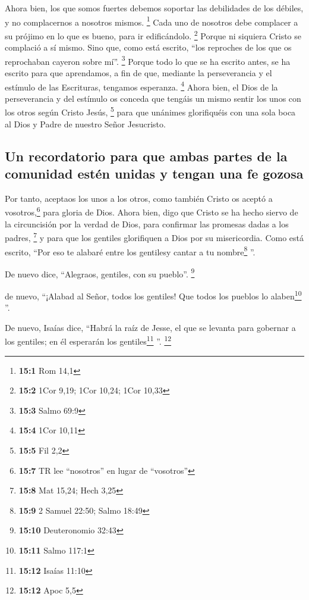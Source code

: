 \begin{paracol}{2}
 Ahora bien, los que somos fuertes debemos soportar las
debilidades de los débiles, y no complacernos a nosotros mismos.
\footnote{\textbf{15:1} Rom 14,1}  Cada uno de nosotros
debe complacer a su prójimo en lo que es bueno, para ir edificándolo.
\footnote{\textbf{15:2} 1Cor 9,19; 1Cor 10,24; 1Cor 10,33}
 Porque ni siquiera Cristo se complació a sí mismo. Sino
que, como está escrito, ``los reproches de los que os reprochaban
cayeron sobre mí''. \footnote{\textbf{15:3} Salmo 69:9} 
Porque todo lo que se ha escrito antes, se ha escrito para que
aprendamos, a fin de que, mediante la perseverancia y el estímulo de las
Escrituras, tengamos esperanza. \footnote{\textbf{15:4} 1Cor 10,11}
 Ahora bien, el Dios de la perseverancia y del estímulo os
conceda que tengáis un mismo sentir los unos con los otros según Cristo
Jesús, \footnote{\textbf{15:5} Fil 2,2}  para que unánimes
glorifiquéis con una sola boca al Dios y Padre de nuestro Señor
Jesucristo.

\hypertarget{un-recordatorio-para-que-ambas-partes-de-la-comunidad-estuxe9n-unidas-y-tengan-una-fe-gozosa}{%
\subsection{Un recordatorio para que ambas partes de la comunidad estén
unidas y tengan una fe
gozosa}\label{un-recordatorio-para-que-ambas-partes-de-la-comunidad-estuxe9n-unidas-y-tengan-una-fe-gozosa}}

 Por tanto, aceptaos los unos a los otros, como también
Cristo os aceptó a vosotros,\footnote{\textbf{15:7} TR lee ``nosotros''
  en lugar de ``vosotros''} para gloria de Dios.  Ahora
bien, digo que Cristo se ha hecho siervo de la circuncisión por la
verdad de Dios, para confirmar las promesas dadas a los padres,
\footnote{\textbf{15:8} Mat 15,24; Hech 3,25}  y para que
los gentiles glorifiquen a Dios por su misericordia. Como está escrito,
``Por eso te alabaré entre los gentilesy cantar a tu nombre\footnote{\textbf{15:9}
  2 Samuel 22:50; Salmo 18:49} ''.

 De nuevo dice, ``Alegraos, gentiles, con su pueblo''.
\footnote{\textbf{15:10} Deuteronomio 32:43}

 de nuevo, ``¡Alabad al Señor, todos los gentiles! Que
todos los pueblos lo alaben\footnote{\textbf{15:11} Salmo 117:1} ''.

 De nuevo, Isaías dice, ``Habrá la raíz de Jesse, el que
se levanta para gobernar a los gentiles; en él esperarán los
gentiles\footnote{\textbf{15:12} Isaías 11:10} ''. \footnote{\textbf{15:12}
  Apoc 5,5}


\end{paracol}

